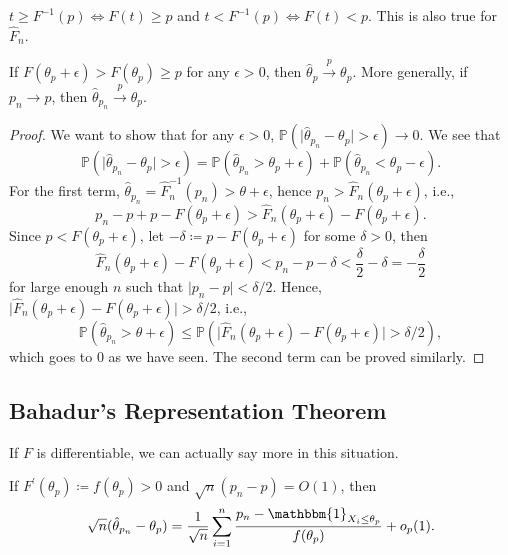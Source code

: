 \begin{prev}
	\(t \geq F^{-1} (p) \iff F(t) \geq p\) and \(t < F^{-1} (p) \iff F(t) < p\). This is also true for \(\hat{F} _n\).
\end{prev}

\begin{theorem}
	If \(F(\theta _p + \epsilon ) > F(\theta _p) \geq p\) for any \(\epsilon > 0\), then \(\hat{\theta} _p \overset{p}{\to} \theta _p\). More generally, if \(p_n \to p\), then \(\hat{\theta} _{p_n} \overset{p}{\to} \theta _p\).
\end{theorem}
\begin{proof}
	We want to show that for any \(\epsilon > 0\), \(\mathbb{P} (\vert \hat{\theta} _{p_n} - \theta _p \vert > \epsilon ) \to 0\). We see that
	\[
		\mathbb{P} (\vert \hat{\theta} _{p_n} - \theta _p \vert > \epsilon )
		= \mathbb{P} (\hat{\theta} _{p_n} > \theta _p + \epsilon ) + \mathbb{P} (\hat{\theta} _{p_n} < \theta _p - \epsilon ).
	\]
	For the first term, \(\hat{\theta} _{p_n} = \hat{F} _n^{-1} (p_n) > \theta + \epsilon \), hence \(p_n > \hat{F} _n(\theta _p + \epsilon )\), i.e.,
	\[
		p_n - p + p  - F(\theta _p + \epsilon )
		> \hat{F} _n(\theta _p + \epsilon ) - F(\theta _p + \epsilon ).
	\]
	Since \(p < F(\theta _p + \epsilon )\), let \(- \delta \coloneqq p - F(\theta _p + \epsilon )\) for some \(\delta > 0\), then
	\[
		\hat{F} _n(\theta _p + \epsilon ) - F(\theta _p + \epsilon )
		< p_n - p - \delta
		< \frac{\delta}{2} - \delta
		= -\frac{\delta}{2}
	\]
	for large enough \(n\) such that \(\vert p_n - p \vert < \delta / 2\). Hence, \(\vert \hat{F} _n(\theta _p + \epsilon ) - F(\theta _p + \epsilon ) \vert > \delta / 2\), i.e.,
	\[
		\mathbb{P} (\hat{\theta} _{p_n} > \theta + \epsilon )
		\leq \mathbb{P} (\vert \hat{F} _n(\theta _p + \epsilon ) - F(\theta _p + \epsilon ) \vert > \delta / 2),
	\]
	which goes to \(0\) as we have seen. The second term can be proved similarly.
\end{proof}

\subsection{Bahadur's Representation Theorem}
If \(F\) is differentiable, we can actually say more in this situation.

\begin{theorem}\label{thm:Bahadur-representation}
	If \(F^{\prime} (\theta _p) \coloneqq f(\theta _p) > 0\) and \(\sqrt{n} (p_n - p) = O(1)\), then
	\[
		\sqrt{n} (\hat{\theta} _{p_n} - \theta _p)
		= \frac{1}{\sqrt{n} } \sum_{i=1}^{n} \frac{p_n - \mathbbm{1}_{X_i \leq \theta _p}}{f(\theta _p)} + o_p(1).
	\]
\end{theorem}

